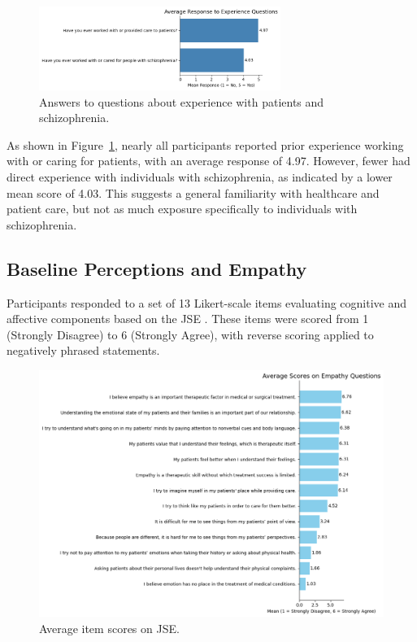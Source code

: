 \begin{figure}[H]
    \centering
    \includegraphics[width=0.7\textwidth]{../../Figures/experience-patients.png}
    \caption{Answers to questions about experience with patients and schizophrenia.}
    \label{fig:experience_patients}
\end{figure}

As shown in Figure~\ref{fig:experience_patients}, nearly all participants reported prior experience working with or caring for patients, with an average response of 4.97. However, fewer had direct experience with individuals with schizophrenia, as indicated by a lower mean score of 4.03. This suggests a general familiarity with healthcare and patient care, but not as much exposure specifically to individuals with schizophrenia.

\subsection{Baseline Perceptions and Empathy}

Participants responded to a set of 13 Likert-scale items evaluating cognitive and affective components based on the JSE \cite{Hojat2002}. These items were scored from 1 (Strongly Disagree) to 6 (Strongly Agree), with reverse scoring applied to negatively phrased statements.

\begin{figure}[H]
    \centering
    \includegraphics[width=\columnwidth]{../../Figures/avg-scores-pre.png}
    \caption{Average item scores on JSE.}
    \label{fig:avg_scores_pre}
\end{figure}

